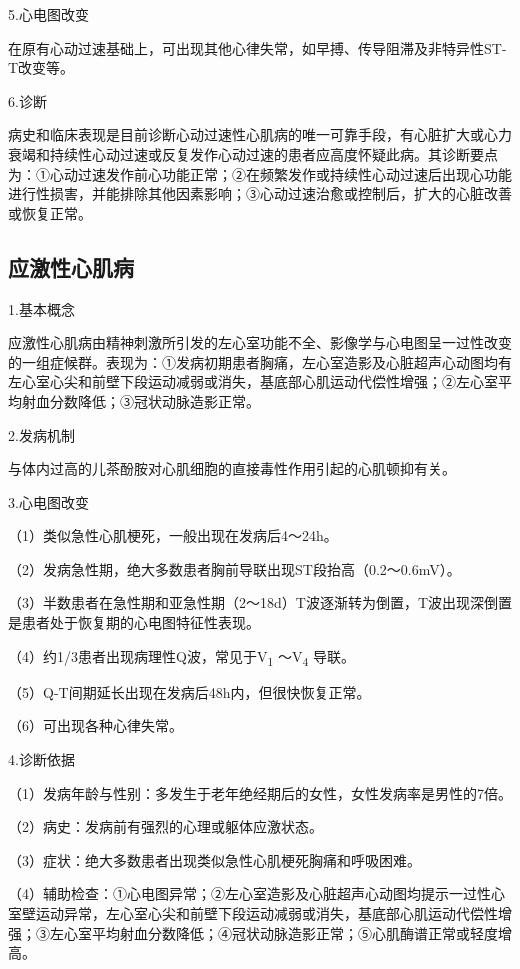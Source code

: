 5.心电图改变

在原有心动过速基础上，可出现其他心律失常，如早搏、传导阻滞及非特异性ST-T改变等。

6.诊断

病史和临床表现是目前诊断心动过速性心肌病的唯一可靠手段，有心脏扩大或心力衰竭和持续性心动过速或反复发作心动过速的患者应高度怀疑此病。其诊断要点为：①心动过速发作前心功能正常；②在频繁发作或持续性心动过速后出现心功能进行性损害，并能排除其他因素影响；③心动过速治愈或控制后，扩大的心脏改善或恢复正常。

\protect\hypertarget{text00051.htmlux5cux23subid621}{}{}

\subsection{应激性心肌病}

1.基本概念

应激性心肌病由精神刺激所引发的左心室功能不全、影像学与心电图呈一过性改变的一组症候群。表现为：①发病初期患者胸痛，左心室造影及心脏超声心动图均有左心室心尖和前壁下段运动减弱或消失，基底部心肌运动代偿性增强；②左心室平均射血分数降低；③冠状动脉造影正常。

2.发病机制

与体内过高的儿茶酚胺对心肌细胞的直接毒性作用引起的心肌顿抑有关。

3.心电图改变

（1）类似急性心肌梗死，一般出现在发病后4～24h。

（2）发病急性期，绝大多数患者胸前导联出现ST段抬高（0.2～0.6mV）。

（3）半数患者在急性期和亚急性期（2～18d）T波逐渐转为倒置，T波出现深倒置是患者处于恢复期的心电图特征性表现。

（4）约1/3患者出现病理性Q波，常见于V\textsubscript{1}
～V\textsubscript{4} 导联。

（5）Q-T间期延长出现在发病后48h内，但很快恢复正常。

（6）可出现各种心律失常。

4.诊断依据

（1）发病年龄与性别：多发生于老年绝经期后的女性，女性发病率是男性的7倍。

（2）病史：发病前有强烈的心理或躯体应激状态。

（3）症状：绝大多数患者出现类似急性心肌梗死胸痛和呼吸困难。

（4）辅助检查：①心电图异常；②左心室造影及心脏超声心动图均提示一过性心室壁运动异常，左心室心尖和前壁下段运动减弱或消失，基底部心肌运动代偿性增强；③左心室平均射血分数降低；④冠状动脉造影正常；⑤心肌酶谱正常或轻度增高。


